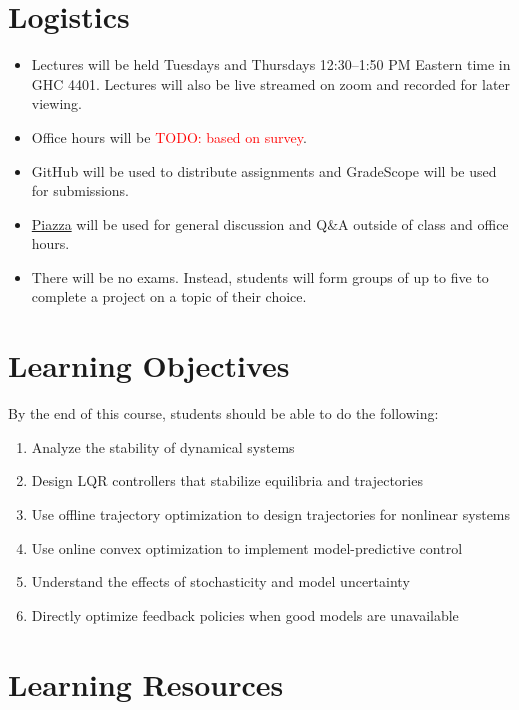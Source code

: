 \documentclass[11pt,letterpaper]{article}
\newcommand{\todo}[1]{\textcolor{red}{TODO: #1}}
\begin{document}
\section*{Logistics}

\begin{itemize}
	\item Lectures will be held Tuesdays and Thursdays 12:30--1:50 PM Eastern time in GHC 4401. Lectures will also be live streamed on zoom and recorded for later viewing.
	\item Office hours will be \todo{based on survey}.
	\item GitHub will be used to distribute assignments and GradeScope will be used for submissions.
	\item \href{https://piazza.com/cmu/spring2024/16745/home}{Piazza} will be used for general discussion and Q\&A outside of class and office hours.
	\item There will be no exams. Instead, students will form groups of up to five to complete a project on a topic of their choice.
\end{itemize}

\newpage 
\section*{Learning Objectives}
By the end of this course, students should be able to do the following:
\begin{enumerate}
	\item Analyze the stability of dynamical systems
	\item Design LQR controllers that stabilize equilibria and trajectories
	\item Use offline trajectory optimization to design trajectories for nonlinear systems
	\item Use online convex optimization to implement model-predictive control
	\item Understand the effects of stochasticity and model uncertainty
	\item Directly optimize feedback policies when good models are unavailable
\end{enumerate}

\section*{Learning Resources}
\end{document}
